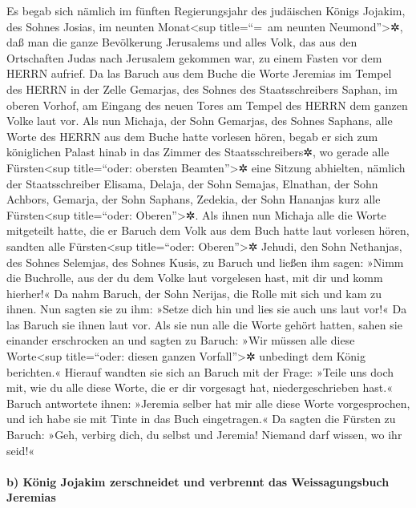 Es begab sich nämlich im fünften Regierungsjahr des
judäischen Königs Jojakim, des Sohnes Josias, im neunten
Monat\textless sup title=``=~am neunten Neumond''\textgreater✲, daß man
die ganze Bevölkerung Jerusalems und alles Volk, das aus den Ortschaften
Judas nach Jerusalem gekommen war, zu einem Fasten vor dem HERRN
aufrief. Da las Baruch aus dem Buche die Worte Jeremias
im Tempel des HERRN in der Zelle Gemarjas, des Sohnes des
Staatsschreibers Saphan, im oberen Vorhof, am Eingang des neuen Tores am
Tempel des HERRN dem ganzen Volke laut vor. Als nun
Michaja, der Sohn Gemarjas, des Sohnes Saphans, alle Worte des HERRN aus
dem Buche hatte vorlesen hören, begab er sich zum
königlichen Palast hinab in das Zimmer des Staatsschreibers✲, wo gerade
alle Fürsten\textless sup title=``oder: obersten Beamten''\textgreater✲
eine Sitzung abhielten, nämlich der Staatsschreiber Elisama, Delaja, der
Sohn Semajas, Elnathan, der Sohn Achbors, Gemarja, der Sohn Saphans,
Zedekia, der Sohn Hananjas kurz alle Fürsten\textless sup title=``oder:
Oberen''\textgreater✲. Als ihnen nun Michaja alle die
Worte mitgeteilt hatte, die er Baruch dem Volk aus dem Buch hatte laut
vorlesen hören, sandten alle Fürsten\textless sup
title=``oder: Oberen''\textgreater✲ Jehudi, den Sohn Nethanjas, des
Sohnes Selemjas, des Sohnes Kusis, zu Baruch und ließen ihm sagen: »Nimm
die Buchrolle, aus der du dem Volke laut vorgelesen hast, mit dir und
komm hierher!« Da nahm Baruch, der Sohn Nerijas, die Rolle mit sich und
kam zu ihnen. Nun sagten sie zu ihm: »Setze dich hin und
lies sie auch uns laut vor!« Da las Baruch sie ihnen laut vor.
Als sie nun alle die Worte gehört hatten, sahen sie
einander erschrocken an und sagten zu Baruch: »Wir müssen alle diese
Worte\textless sup title=``oder: diesen ganzen Vorfall''\textgreater✲
unbedingt dem König berichten.« Hierauf wandten sie sich
an Baruch mit der Frage: »Teile uns doch mit, wie du alle diese Worte,
die er dir vorgesagt hat, niedergeschrieben hast.« Baruch
antwortete ihnen: »Jeremia selber hat mir alle diese Worte
vorgesprochen, und ich habe sie mit Tinte in das Buch eingetragen.«
Da sagten die Fürsten zu Baruch: »Geh, verbirg dich, du
selbst und Jeremia! Niemand darf wissen, wo ihr seid!«

\hypertarget{b-kuxf6nig-jojakim-zerschneidet-und-verbrennt-das-weissagungsbuch-jeremias}{%
\paragraph{b) König Jojakim zerschneidet und verbrennt das
Weissagungsbuch
Jeremias}\label{b-kuxf6nig-jojakim-zerschneidet-und-verbrennt-das-weissagungsbuch-jeremias}}


